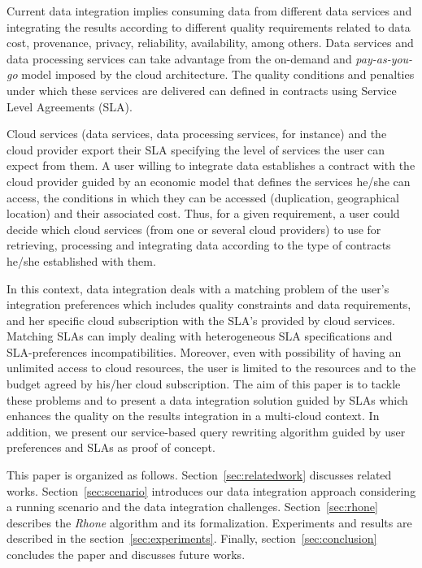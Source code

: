 Current data integration implies consuming data from different data services and
integrating the results according to different quality requirements related to
data cost, provenance, privacy, reliability, availability, among others. Data
services and data processing services can take advantage from the on-demand and
\textit{pay-as-you-go} model imposed by the cloud architecture. The quality
conditions and penalties under which these services are delivered can defined in
contracts using Service Level Agreements (SLA).        

Cloud services (data services, data processing services, for instance) and the
cloud provider export their SLA specifying the level of services the user can
expect from them. A user willing to integrate data establishes a contract with
the cloud provider guided by an economic model that defines the services he/she can
access, the conditions in which they can be accessed (duplication, geographical
location) and their associated cost. Thus, for a given requirement, a user could
decide which cloud services (from one or several cloud providers) to use for
retrieving, processing and integrating data according to the type of contracts
he/she established with them.         

In this context, data integration deals with a matching problem of the user's
integration preferences which includes quality constraints and data
requirements, and her specific cloud subscription with the SLA's provided by
cloud services. Matching SLAs can imply dealing with heterogeneous SLA
specifications and SLA-preferences incompatibilities. Moreover, even with
possibility of having an unlimited access to cloud resources, the user is
limited to the resources and to the budget agreed by his/her cloud subscription. The
aim of this paper is to tackle these problems and to present a data integration solution guided by SLAs which enhances the quality on the results integration in a multi-cloud context. In addition, we present our
service-based query rewriting algorithm guided by user preferences and  SLAs as
proof of concept.           

This paper is organized as follows. 
Section~\ref{sec:relatedwork} discusses related works.
Section~\ref{sec:scenario} introduces our data integration approach considering
a running scenario and the data integration challenges. 
Section~\ref{sec:rhone} describes the \textit{Rhone} algorithm and its formalization. Experiments and results are described in the section~\ref{sec:experiments}. 
Finally, section~\ref{sec:conclusion} concludes the paper and discusses future works.

